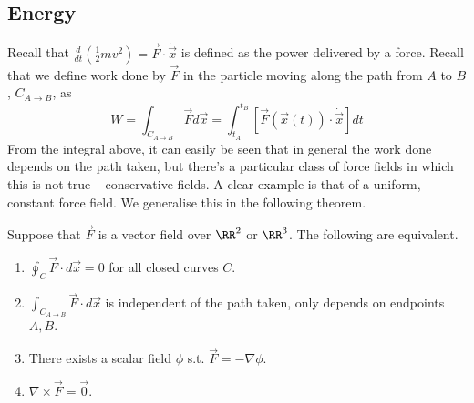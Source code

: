 \subsection{Energy}
Recall that $\frac{d}{dt}\left( \frac{1}{2}mv^2 \right) = \vec{F}\cdot
\dot{\vec{x}}$ is defined as the power delivered by a force. Recall that we
define work done by $\vec{F}$ in the particle moving along the path from $A$ to
$B$, $C_{A\to B}$, as
\[W = \int_{C_{A\to B}}\vec{F} d\vec{x} = \int_{t_A}^{t_B} \left[
\vec{F}(\vec{x}(t)) \cdot \dot{\vec{x}} \right] dt\]
From the integral above, it can easily be seen that in general the work done
depends on the path taken, but there's a particular class of force fields in
which this is not true -- conservative fields. A clear example is that of a
uniform, constant force field. We generalise this in the following theorem.
\begin{theorem}
  Suppose that $\vec{F}$ is a vector field over $\RR^2$ or $\RR^3$. The
  following are equivalent.
  \begin{enumerate}
    \item $\oint_C \vec{F}\cdot d\vec{x} =0$ for all closed curves $C$.
    \item $\int_{C_{A\to B}} \vec{F}\cdot d\vec{x}$ is independent of the path
      taken, only depends on endpoints $A,B$.
    \item There exists a scalar field $\phi$ s.t. $\vec{F}=-\nabla \phi$.
    \item $\nabla \times \vec{F}=\vec{0}$.
  \end{enumerate}
  \label{thm:conservativeFieldsEquivalence}
\end{theorem}
